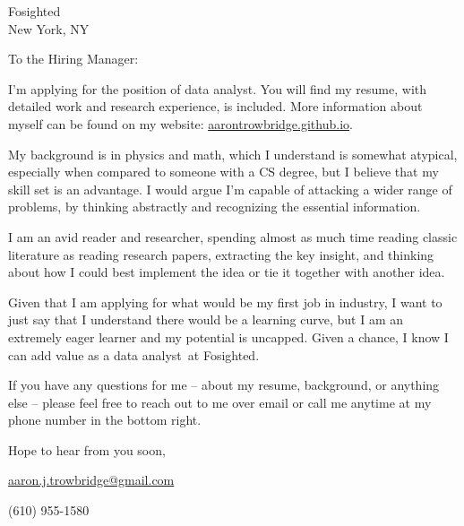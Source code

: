\documentclass{letter}
\newcommand{\position}   {data analyst}
\newcommand{\company}    {Fosighted}
\newcommand{\city}       {New York, NY}
\begin{document}
\begin{letter}{
    \company \\ 
    \city
}

\opening{To the Hiring Manager:}

I'm applying for the position of \position. You will find my resume, with detailed work and research experience, is included.  More information about myself can be found on my website: \href{https://aarontrowbridge.github.io/}{\underline{aarontrowbridge.github.io}}.

My background is in physics and math, which I understand is somewhat atypical, especially when compared to someone with a CS degree, but I believe that my skill set is an advantage. I would argue I'm capable of attacking a wider range of problems, by thinking abstractly and recognizing the essential information.

I am an avid reader and researcher, spending almost as much time reading classic literature as reading research papers, extracting the key insight, and thinking about how I could best implement the idea or tie it together with another idea.  

Given that I am applying for what would be my first job in industry, I want to just say that I understand there would be a learning curve, but I am an extremely eager learner and my potential is uncapped.  Given a chance, I know I can add value as a \position \ at \company.

If you have any questions for me -- about my resume, background, or anything else -- please feel free to reach out to me over email or call me anytime at my phone number in the bottom right.  

\closing{Hope to hear from you soon,}

\vfill 

\hfill \href{mailto:aaron.j.trowbridge@gmail.com}{aaron.j.trowbridge@gmail.com} 

\hfill (610) 955-1580

\end{letter}
\end{document}
